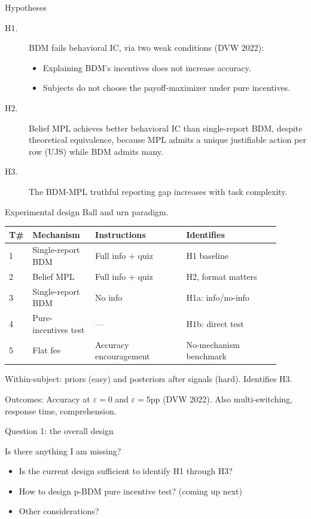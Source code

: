 \documentclass[11pt,aspectratio=169]{beamer}
\begin{document}
\begin{frame}{Hypotheses}
\begin{description}
\item[H1.] BDM fails behavioral IC, via two weak conditions (DVW 2022):
\begin{itemize}
\item[H1a.] Explaining BDM's incentives does not increase accuracy.
\item[H1b.] Subjects do not choose the payoff-maximizer under pure incentives.
\end{itemize}
\item[H2.] Belief MPL achieves better behavioral IC than single-report BDM, despite theoretical equivalence, because MPL admits a unique justifiable action per row (UJS) while BDM admits many.
\item[H3.] The BDM-MPL truthful reporting gap increases with task complexity.
\end{description}
\end{frame}

\begin{frame}{Experimental design}
Ball and urn paradigm.
\vspace{0.7em}
\footnotesize
\setlength{\tabcolsep}{4pt}
\begin{tabular}{@{}p{0.03\linewidth} p{0.22\linewidth} p{0.32\linewidth} p{0.33\linewidth}@{}}
\toprule
T\# & Mechanism & Instructions & Identifies \\
\midrule
1 & Single-report BDM & Full info + quiz & H1 baseline \\
2 & Belief MPL & Full info + quiz & H2, format matters \\
3 & Single-report BDM & No info & H1a: info/no-info \\
4 & Pure-incentives test & --- & H1b: direct test \\
5 & Flat fee & Accuracy encouragement & No-mechanism benchmark \\
\bottomrule
\end{tabular}

\vspace{0.7em}
\small
Within-subject: priors (easy) and posteriors after signals (hard). Identifies H3.

Outcomes: Accuracy at $\varepsilon = 0$ and $\varepsilon = 5$pp (DVW 2022). Also multi-switching, response time, comprehension.

\end{frame}

\begin{frame}{Question 1: the overall design}
\begin{block}{}
Is there anything I am missing?
\end{block}

\vspace{1em}
\begin{itemize}
\item Is the current design sufficient to identify H1 through H3?
\item How to design p-BDM pure incentive test? (coming up next)
\item Other considerations?
\end{itemize}
\end{frame}
\end{document}
